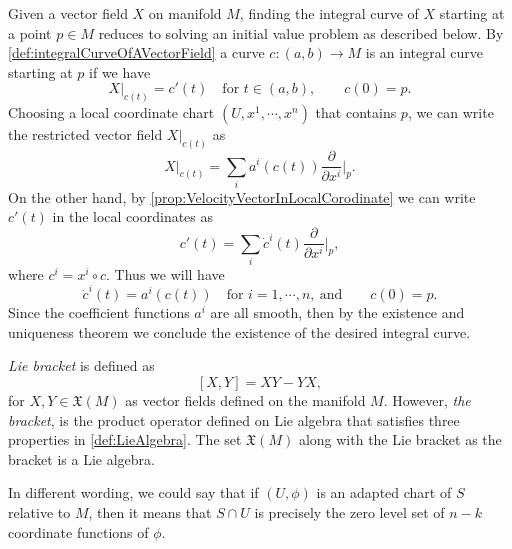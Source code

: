 \begin{summary}
	Given a vector field $ X $ on manifold $ M $, finding the integral curve of $ X $ starting at a point $ p \in M $ reduces to solving an initial value problem as described below. By \autoref{def:integralCurveOfAVectorField} a curve $ c:(a,b) \to M $ is an integral curve starting at $ p $ if we have
	\[ X|_{c(t)} = c'(t) \quad \text{for } t\in (a,b),\qquad c(0) = p.   \]
	Choosing a local coordinate chart $ (U,x^1,\cdots,x^n) $ that contains $ p $, we can write the restricted vector field $ X|_{c(t)} $ as
	\[ X|_{c(t)} = \sum_i a^i(c(t)) \frac{\partial}{\partial x^i}\big|_{p}.  \]
	On the other hand, by \autoref{prop:VelocityVectorInLocalCorodinate} we can write $ c'(t) $ in the local coordinates as
	\[ c'(t) = \sum_i \dot{c}^i(t) \frac{\partial }{\partial x^i}\big|_{p},    \]
	where $ c^i = x^i \circ c $.
	Thus we will have
	\[ \dot{c}^i(t) = a^i(c(t)) \quad \text{for } i=1,\cdots,n,\ \text{and} \qquad c(0) = p.\]
	Since the coefficient functions $ a^i $ are all smooth, then by the existence and uniqueness theorem we conclude the existence of the desired integral curve. 
\end{summary}

\begin{summary}
	\emph{Lie bracket} is defined as 
	\[ [X,Y] = XY - YX, \]
	for $ X,Y \in \mathfrak{X}(M) $ as vector fields defined on the manifold $ M $. However, \emph{the bracket}, is the product operator defined on Lie algebra that satisfies three properties in \autoref{def:LieAlgebra}. The set $ \mathfrak{X}(M) $ along with the Lie bracket as the bracket is a Lie algebra. 
\end{summary}

\begin{summary}
	In different wording, we could say that if $ (U,\phi) $ is an adapted chart of $ S  $ relative to $ M $, then it means that $ S\cap U $ is precisely the zero level set of $ n-k $ coordinate functions of $ \phi $.
\end{summary}



